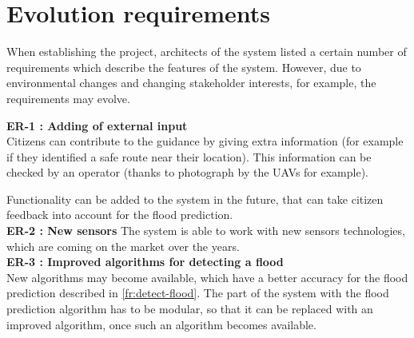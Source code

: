 \section{Evolution requirements}

When establishing the project, architects of the system listed a certain number of requirements which describe the features of the system. However, due to environmental changes and changing stakeholder interests, for example, the requirements may evolve.




\textbf{ER-1 : Adding of external input}\\
 Citizens can contribute to the guidance by giving extra information (for example if they identified a safe route near their location). This information can be checked by an operator (thanks to photograph by the UAVs for example). 
 
 Functionality can be added to the system in the future, that can take citizen feedback into account for the flood prediction.
 \\
 
\textbf{ER-2 : New sensors } The system is able to work with new sensors technologies, which are coming on the market over the years. \\

\textbf{ER-3 : Improved algorithms for detecting a flood} \\
New algorithms may become available, which have a better accuracy for the flood prediction described in \ref{fr:detect-flood}. The part of the system with the flood prediction algorithm has to be modular, so that it can be replaced with an improved algorithm, once such an algorithm becomes available.





